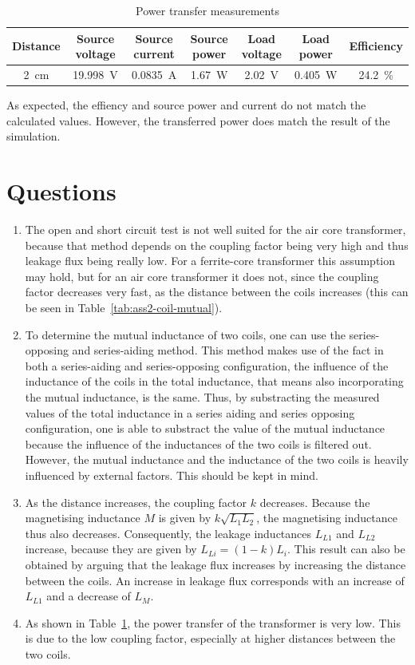 \documentclass[11pt,titlepage]{report}
\begin{document}
\begin{table}[H]
	\centering
	\caption{Power transfer measurements}
	\label{tab:ass2-power}
	\begin{tabular}{c c c c c c c}
		\hline\hline
		Distance & Source voltage & Source current & Source power & Load voltage & Load power & Efficiency \\
		\hline
		\SI{2}{cm} & \SI{19.998}{V} & \SI{0.0835}{A} & \SI{1.67}{W} & \SI{2.02}{V} & \SI{0.405}{W} & \SI{24.2}{\percent} \\
		\hline
		\end{tabular}
\end{table}

As expected, the effiency and source power and current do not match the calculated values. However, the transferred power does match the result of the simulation.

\section{Questions}
\begin{enumerate}
\item
The open and short circuit test is not well suited for the air core transformer, because that method depends on the coupling factor being very high and thus leakage flux being really low. For a ferrite-core transformer this assumption may hold, but for an air core transformer it does not, since the coupling factor decreases very fast, as the distance between the coils increases (this can be seen in Table~\ref{tab:ass2-coil-mutual}).

\item
To determine the mutual inductance of two coils, one can use the series-opposing and series-aiding method. This method makes use of the fact in both a series-aiding and series-opposing configuration, the influence of the inductance of the coils in the total inductance, that means also incorporating the mutual inductance, is the same. Thus, by substracting the measured values of the total inductance in a series aiding and series opposing configuration, one is able to substract the value of the mutual inductance because the influence of the inductances of the two coils is filtered out. However, the mutual inductance and the inductance of the two coils is heavily influenced by external factors. This should be kept in mind. 

\item
As the distance increases, the coupling factor $k$ decreases. Because the magnetising inductance $M$ is given by $k \sqrt{L_1 L_2}$, the magnetising inductance thus also decreases. Consequently, the leakage inductances $L_{L1}$ and $L_{L2}$ increase, because they are given by $L_{Li}=(1-k) L_{i}$. This result can also be obtained by arguing that the leakage flux increases by increasing the distance between the coils. An increase in leakage flux corresponds with an increase of $L_{L1}$ and a decrease of $L_{M}$.

\item
As shown in Table~\ref{tab:ass2-power}, the power transfer of the transformer is very low. This is due to the low coupling factor, especially at higher distances between the two coils.
\end{enumerate}
\end{document}
